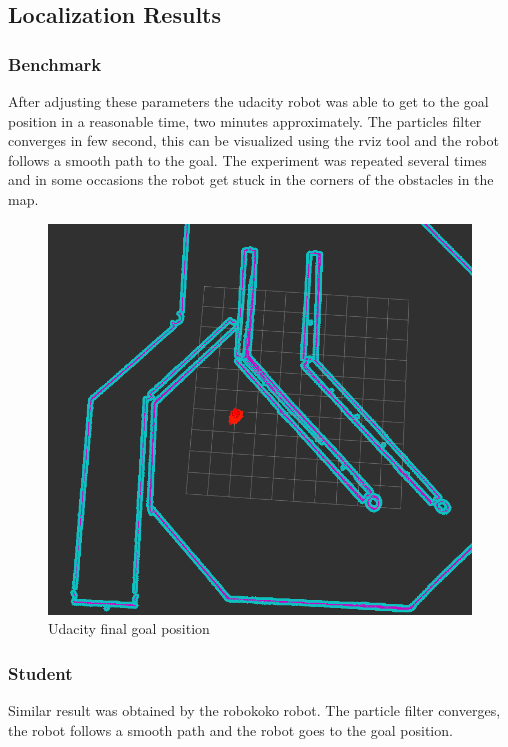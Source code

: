 \documentclass[10pt,journal,compsoc]{IEEEtran}
\begin{document}
\subsection{Localization Results}
\subsubsection{Benchmark}

After adjusting these parameters the udacity robot was able to get to the goal position in a reasonable time, two minutes approximately. The particles filter converges in few second, this can be visualized using the rviz tool and the robot follows a smooth path to the goal. The experiment was repeated several times and in some occasions the robot get stuck in the corners of the obstacles in the map. 

\begin{figure}[h]
\centering
\includegraphics[scale=0.25]{rviz-robot-udacity-goal-position}
\caption{Udacity final goal position}
\label{fig:mesh3}
\end{figure}

\subsubsection{Student}

Similar result was obtained by the robokoko robot. The particle filter converges, the robot follows a smooth path and the robot goes to the goal position.
\end{document}
